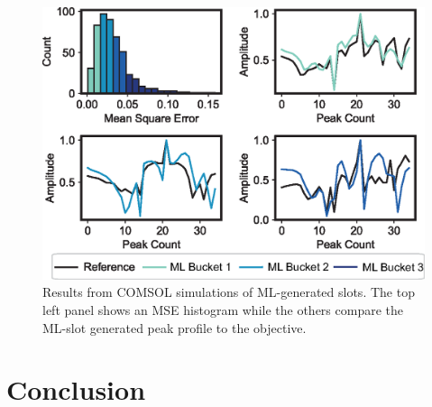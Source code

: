 \documentclass[11pt]{article}
\begin{document}
\begin{figure}[H]
	\centering
	\includegraphics{figures/fig2_labeled.eps}
	\caption{Results from COMSOL simulations of ML-generated slots. The top left panel shows an MSE histogram while the others compare the ML-slot generated peak profile to the objective.}
\end{figure}




\section*{Conclusion}



\end{document}
